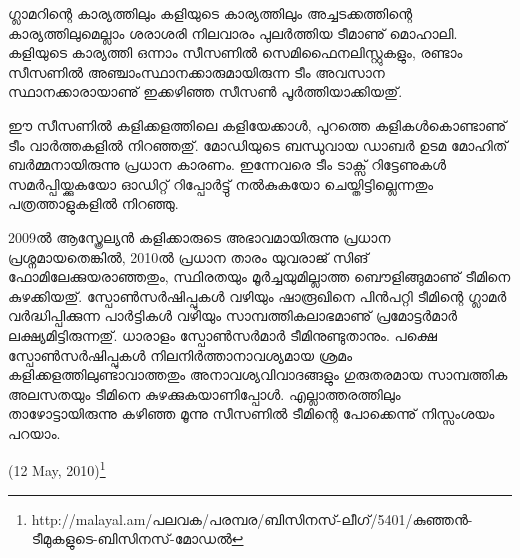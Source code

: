 ഗ്ലാമറിന്റെ കാര്യത്തിലും കളിയുടെ കാര്യത്തിലും അച്ചടക്കത്തിന്റെ കാര്യത്തിലുമെല്ലാം ശരാശരി നിലവാരം പുലര്‍ത്തിയ 
ടീമാണു് മൊഹാലി. കളിയുടെ കാര്യത്തി ഒന്നാം സീസണില്‍ സെമിഫൈനലിസ്റ്റുകളും, രണ്ടാം സീസണില്‍ 
അഞ്ചാംസ്ഥാനക്കാരുമായിരുന്ന ടീം അവസാന സ്ഥാനക്കാരായാണു് ഇക്കഴിഞ്ഞ സീസണ്‍ പൂര്‍ത്തിയാക്കിയതു്.

ഈ സീസണില്‍ കളിക്കളത്തിലെ കളിയേക്കാള്‍, പുറത്തെ കളികള്‍കൊണ്ടാണു് ടീം വാര്‍ത്തകളില്‍ നിറഞ്ഞതു്. 
മോഡിയുടെ ബന്ധുവായ ഡാബര്‍ ഉടമ മോഹിത് ബര്‍മ്മനായിരുന്നു പ്രധാന കാരണം. ഇന്നേവരെ ടീം ടാക്സ് റിട്ടേണുകള്‍ 
സമര്‍പ്പിയ്ക്കുകയോ ഓഡിറ്റ് റിപ്പോര്‍ട്ടു് നല്‍കുകയോ ചെയ്തിട്ടില്ലെന്നതും പത്രത്താളുകളില്‍ നിറഞ്ഞു.

2009ല്‍ ആസ്ത്രേല്യന്‍ കളിക്കാരുടെ അഭാവമായിരുന്നു പ്രധാന പ്രശ്നമായതെങ്കില്‍, 2010ല്‍ പ്രധാന താരം യുവരാജ് സിങ് 
ഫോമിലേക്കുയരാഞ്ഞതും, സ്ഥിരതയും മൂര്‍ച്ചയുമില്ലാത്ത ബൌളിങ്ങുമാണു് ടീമിനെ കുഴക്കിയതു്. സ്പോണ്‍സര്‍ഷിപ്പുകള്‍ വഴിയും 
ഷാരൂഖിനെ പിന്‍പറ്റി ടീമിന്റെ ഗ്ലാമര്‍ വര്‍ദ്ധിപ്പിക്കുന്ന പാര്‍ട്ടികള്‍ വഴിയും സാമ്പത്തികലാഭമാണു് പ്രമോട്ടര്‍മാര്‍ ലക്ഷ്യമിട്ടിരുന്നതു്. 
ധാരാളം സ്പോണ്‍സര്‍മാര്‍ ടീമിനുണ്ടുതാനും. പക്ഷെ സ്പോണ്‍സര്‍ഷിപ്പുകള്‍ നിലനിര്‍ത്താനാവശ്യമായ ശ്രമം 
കളിക്കളത്തിലുണ്ടാവാത്തതും അനാവശ്യവിവാദങ്ങളും ഗുരുതരമായ സാമ്പത്തിക അലസതയും ടീമിനെ കുഴക്കുകയാണിപ്പോള്‍. 
എല്ലാത്തരത്തിലും താഴോട്ടായിരുന്നു കഴിഞ്ഞ മൂന്നു സീസണില്‍ ടീമിന്റെ പോക്കെന്നു് നിസ്സംശയം പറയാം.

\begin{flushright}(12 May, 2010)\footnote{http://malayal.am/പലവക/പരമ്പര/ബിസിനസ്-ലീഗ്/5401/കുഞ്ഞന്‍-ടീമുകളുടെ-ബിസിനസ്-മോഡല്‍}\end{flushright}

\newpage
